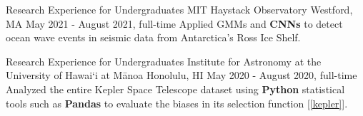 \begin{cventries}
\vspace{0mm}

\cventry
{Research Experience for Undergraduates}
{MIT Haystack Observatory}
{Westford, MA}
{May 2021 - August 2021, full-time}
{
    Applied GMMs and \textbf{CNNs} to detect ocean wave events in seismic data from Antarctica's Ross Ice Shelf.
}

\vspace{0mm}

\cventry
{Research Experience for Undergraduates}
{Institute for Astronomy at the University of Hawai`i at Mānoa}
{Honolulu, HI}
{May 2020 - August 2020, full-time}
{
    Analyzed the entire Kepler Space Telescope dataset using \textbf{Python} statistical tools such as \textbf{Pandas} to evaluate the biases in its selection function [\ref{kepler}].
}

\vspace{-2mm}

\end{cventries}
